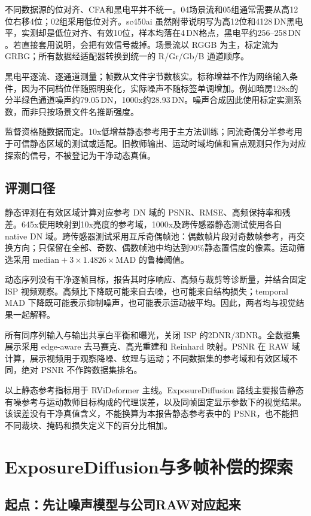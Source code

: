 \documentclass[11pt,a4paper,UTF8,fontset=fandol]{ctexart}
\newcommand{\dn}{\ensuremath{\,\mathrm{DN}}}
\begin{document}
不同数据源的位对齐、CFA和黑电平并不统一。04场景流和05组通常需要从高12位右移4位；02组采用低位对齐。sc450ai 虽然附带说明写为高12位和4128\dn 黑电平，实测却是低位对齐、有效10位，样本均落在4\dn 格点，黑电平约256--258\dn。若直接套用说明，会把有效信号裁掉。场景流以 RGGB 为主，标定流为 GRBG；所有数据经适配器转换到统一的 R/Gr/Gb/B 通道顺序。

黑电平逐流、逐通道测量；帧数从文件字节数核实。标称增益不作为网络输入条件，因为不同档位伴随照明变化，实际噪声不随标签单调增加。例如暗房128x的分半绿色通道噪声约79.05\dn，1000x约28.93\dn。噪声合成因此使用标定实测系数，而非只按场景文件名推断强度。

监督资格随数据而定。10x低增益静态参考用于主方法训练；同流奇偶分半参考用于可信静态区域的测试或适配。旧教师输出、运动时域均值和盲点观测只作为对应探索的信号，不被登记为干净动态真值。

\subsection{评测口径}

静态评测在有效区域计算对应参考 DN 域的 PSNR、RMSE、高频保持率和残差。645x使用映射到10x亮度的参考域，1000x及跨传感器静态测试使用各自 native DN 域。跨传感器测试采用互斥奇偶帧池：偶数帧片段对奇数帧参考，再交换方向；只保留在全部、奇数、偶数帧池中均达到90\%静态置信度的像素。运动筛选采用 $\mathrm{median}+3\times1.4826\times\mathrm{MAD}$ 的鲁棒阈值。

动态序列没有干净逐帧目标，报告其时序响应、高频与裁剪等诊断量，并结合固定 ISP 视频观察。高频比下降既可能来自去噪，也可能来自结构损失；temporal MAD 下降既可能表示抑制噪声，也可能表示运动被平均。因此，两者均与视觉结果一起解释。

所有同序列输入与输出共享白平衡和曝光，关闭 ISP 的2DNR/3DNR。全数据集展示采用 edge-aware 去马赛克、高光重建和 Reinhard 映射。PSNR 在 RAW 域计算，展示视频用于观察降噪、纹理与运动；不同数据集的参考域和有效区域不同，绝对 PSNR 不作跨数据集排名。

以上静态参考指标用于 RViDeformer 主线。ExposureDiffusion 路线主要报告静态有噪参考与运动教师目标构成的代理误差，以及同帧固定显示参数下的视觉结果。该误差没有干净真值含义，不能换算为本报告静态参考表中的 PSNR，也不能把不同裁块、掩码和损失定义下的百分比相加。

\section{ExposureDiffusion与多帧补偿的探索}
\label{sec:djc}

\subsection{起点：先让噪声模型与公司RAW对应起来}
\end{document}
